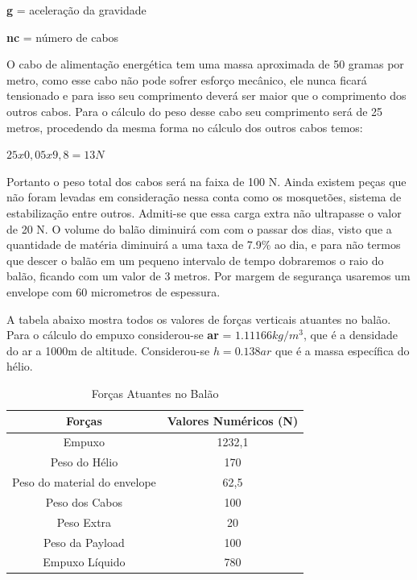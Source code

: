 \textbf{g} =  aceleração da gravidade

\textbf{nc} = número de cabos

O cabo de alimentação energética tem uma massa aproximada de 50 gramas por metro, como esse cabo não pode sofrer esforço mecânico, ele nunca  ficará tensionado e para isso seu comprimento deverá ser maior que o comprimento dos outros cabos. Para o cálculo do peso desse cabo seu comprimento será de 25 metros, procedendo da mesma forma no cálculo dos outros cabos temos:

$25 x 0,05x 9,8 = 13 N$

Portanto o peso total dos cabos será na faixa de 100 N.
Ainda existem peças que não foram levadas em consideração nessa conta como os mosquetões, sistema de estabilização entre outros. Admiti-se que essa carga extra não ultrapasse o valor de 20 N.
O volume do balão diminuirá com com o passar dos dias, visto que a quantidade de matéria diminuirá a uma taxa de 7.9\% ao dia, e para não termos que descer o balão em um pequeno intervalo de tempo dobraremos o raio do balão, ficando com um valor de 3 metros. Por margem de segurança usaremos um envelope com 60 micrometros de espessura.

A tabela abaixo mostra todos os valores de forças verticais atuantes no balão. Para o cálculo do empuxo considerou-se \textbf{ar}  = $1.11166 kg/m^3$, que é a densidade do ar a 1000m de altitude. Considerou-se $h = 0.138 ar$ que é a massa específica do hélio.

\begin{table}[H]
	\centering
	\begin{tabular}{|c|c|}
		\hline
		\rowcolor[HTML]{FFFFFF}
		{\color[HTML]{000000} \textbf{Forças}} & {\color[HTML]{000000} \textbf{Valores Numéricos (N)}} \\ \hline
		Empuxo                                 & 1232,1                                                \\ \hline
		Peso do Hélio                          & 170                                                   \\ \hline
		Peso do material do envelope           & 62,5                                                  \\ \hline
		Peso dos Cabos                         & 100                                                   \\ \hline
		Peso Extra                             & 20                                                    \\ \hline
		Peso da Payload                        & 100                                                   \\ \hline
		Empuxo Líquido                         & 780                                                   \\ \hline
	\end{tabular}
	\caption{Forças Atuantes no Balão}
	\label{tab:forcasAtuantes}
\end{table}

